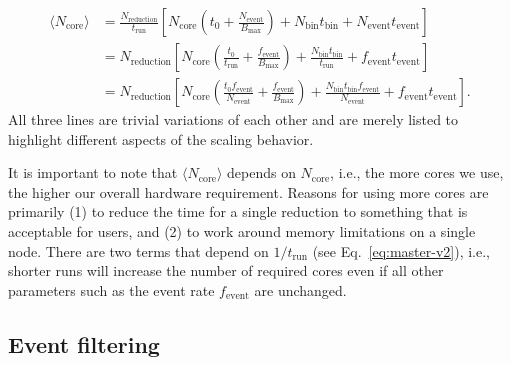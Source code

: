 \documentclass[a4paper,english,numbers=noenddot,bibliography=totoc,chapterprefix=on,DIV=12]{scrartcl}
\newcommand{\Trun}{t_{\text{run}}}
\newcommand{\Tbin}{t_{\text{bin}}}
\newcommand{\Tevent}{t_{\text{event}}}
\newcommand{\Nbin}{N_{\text{bin}}}
\newcommand{\Ncore}{N_{\text{core}}}
\newcommand{\Ncoremean}{\langle N_{\text{core}}\rangle}
\newcommand{\Nevent}{N_{\text{event}}}
\newcommand{\Nreduction}{N_{\text{reduction}}}
\newcommand{\Bmax}{B_{\text{max}}}
\newcommand{\Fevent}{f_{\text{event}}}
\begin{document}
\begin{align}
  \Ncoremean &= \frac{\Nreduction}{\Trun}\left[\Ncore \left(t_0 + \frac{\Nevent}{\Bmax}\right) + \Nbin\Tbin + \Nevent\Tevent\right]\\
  \label{eq:master-v2}
   &= \Nreduction\left[\Ncore \left(\frac{t_0}{\Trun} + \frac{\Fevent}{\Bmax}\right) + \frac{\Nbin\Tbin}{\Trun} + \Fevent\Tevent\right]\\
   &= \Nreduction\left[\Ncore \left(\frac{t_0\Fevent}{\Nevent} + \frac{\Fevent}{\Bmax}\right) + \frac{\Nbin\Tbin\Fevent}{\Nevent} + \Fevent\Tevent\right].
\end{align}
All three lines are trivial variations of each other and are merely listed to highlight different aspects of the scaling behavior.

It is important to note that $\Ncoremean$ depends on $\Ncore$, i.e., the more cores we use, the higher our overall hardware requirement.
Reasons for using more cores are primarily (1) to reduce the time for a single reduction to something that is acceptable for users, and (2) to work around memory limitations on a single node.
There are two terms that depend on $1/\Trun$ (see Eq.~\eqref{eq:master-v2}), i.e., shorter runs will increase the number of required cores even if all other parameters such as the event rate $\Fevent$ are unchanged.

%


\subsection{Event filtering}
\end{document}
